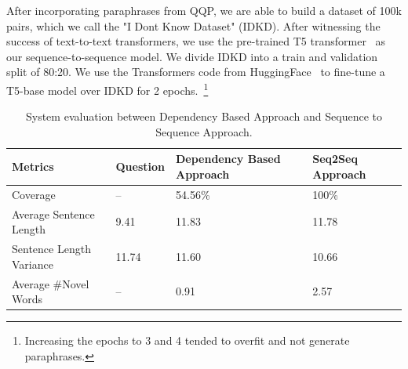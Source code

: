 \documentclass[11pt,a4paper]{article}
\begin{document}
After incorporating paraphrases from QQP, we are able to build a dataset of 100k pairs, which we call the "I Dont Know Dataset" (IDKD). After witnessing the success of text-to-text transformers, we use the pre-trained T5 transformer~\cite{raffel2020exploring} as our sequence-to-sequence model. We divide IDKD into a train and validation split of 80:20. We use the Transformers code from HuggingFace~\cite{wolf-etal-2020-transformers} to fine-tune a T5-base model over IDKD for 2 epochs.~\footnote{Increasing the epochs to 3 and 4 tended to overfit and not generate paraphrases.}


%
\begin{table}[ht!]
\small
\centering
\begin{tabular}{|M{4.0cm} L{1.6cm}| C{4.5cm} | R{3.3cm}|}
\hline
\textbf{Metrics} &
\textbf{Question} &
\textbf{Dependency Based Approach} &
\textbf{Seq2Seq Approach}\\
\hline
Coverage &
-- &
\hspace{.2cm}54.56\% &
100\%\\
Average Sentence Length &
9.41  &
11.83 & 
11.78\\
Sentence Length Variance &
11.74 &
11.60 & 
10.66\\
Average \#Novel Words &
-- &
0.91 &
2.57\\

\hline
\end{tabular}
\caption{System evaluation between Dependency Based Approach and Sequence to Sequence Approach.
  }
\label{system_evaluation-table}
\end{table}
\end{document}
